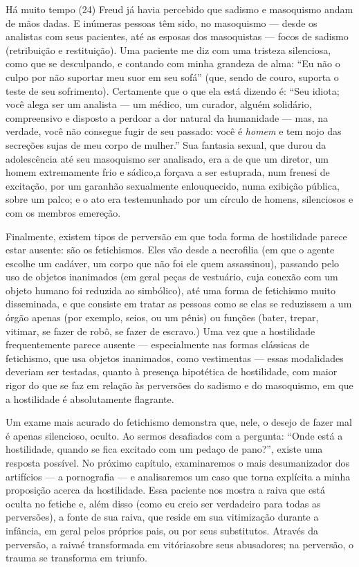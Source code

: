 Há muito tempo (24) Freud\idxfreudsadom{} já havia percebido que sadismo e
masoquismo andam de mãos dadas. E inúmeras pessoas têm sido, no
masoquismo --- desde os analistas com seus pacientes, até as esposas
dos masoquistas --- focos de sadismo\idxfantasado{} (retribuição e restituição).\idxsadifant{} Uma
paciente me diz com uma tristeza silenciosa, como que se desculpando, e
contando com minha grandeza de alma: ``Eu não o culpo por não suportar
meu suor em seu sofá'' (que, sendo de couro, suporta o teste de seu
sofrimento). Certamente que o que ela está dizendo é: ``Seu idiota; você
alega ser um analista --- um médico, um curador, alguém solidário,
compreensivo e disposto a perdoar a dor natural da humanidade --- mas, na
verdade, você não consegue fugir de seu passado: você é \textit{homem}
e tem nojo das secreções sujas de meu corpo de mulher.'' Sua fantasia
sexual, que durou da adolescência até seu masoquismo ser analisado, era
a de que um diretor, um homem extremamente frio e sádico,\idxmasoqsad[|)] a forçava a
ser estuprada, num frenesi de excitação, por um garanhão sexualmente
enlouquecido, numa exibição pública, sobre um palco; e o ato era
testemunhado por um círculo de homens, silenciosos e com os membros em\idxmasoq[|)]
ereção.

Finalmente, existem tipos de perversão em que toda forma de
hostilidade\idxfetichost{} parece estar ausente: são os fetichismos. Eles vão desde a
necrofilia\idxnecro{} (em que o agente escolhe um cadáver, um corpo que não foi
ele quem assassinou), passando pelo uso de objetos inanimados (em geral
peças de vestuário, cuja conexão com um objeto humano foi reduzida ao
simbólico), até uma forma de fetichismo muito disseminada, e que
consiste em tratar as pessoas como se elas se reduzissem a um órgão
apenas (por exemplo, seios, ou um pênis) ou funções (bater, trepar,
vitimar, se fazer de robô, se fazer de escravo.) Uma vez que a
hostilidade frequentemente parece ausente --- especialmente nas formas
clássicas de fetichismo, que usa objetos inanimados, como vestimentas ---
 essas modalidades deveriam ser testadas, quanto à presença hipotética
de hostilidade, com maior rigor do que se faz em relação às perversões
do sadismo e do masoquismo, em que a hostilidade é absolutamente
flagrante.

 Um exame mais acurado do fetichismo demonstra que, nele, o desejo de
fazer mal é apenas silencioso, oculto. Ao sermos desafiados com a
pergunta: ``Onde está a hostilidade, quando se fica excitado com um
pedaço de pano?'', existe uma resposta possível. No próximo capítulo,
examinaremos o mais desumanizador dos artifícios --- a pornografia --- e
analisaremos um caso que torna explícita a minha proposição acerca da
hostilidade. Essa paciente nos mostra a raiva que está oculta no
fetiche e, além disso (como eu creio ser verdadeiro para todas as
perversões), a fonte de sua raiva, que reside em sua vitimização\idxinfanvitim{}
durante a infância, em geral pelos próprios pais, ou por seus
substitutos. Através da perversão, a raiva\idxhost[|)] é transformada em vitória\idxsadimaso[|)]
sobre seus abusadores; na perversão, o trauma\idxtrauma{} se transforma em triunfo.



